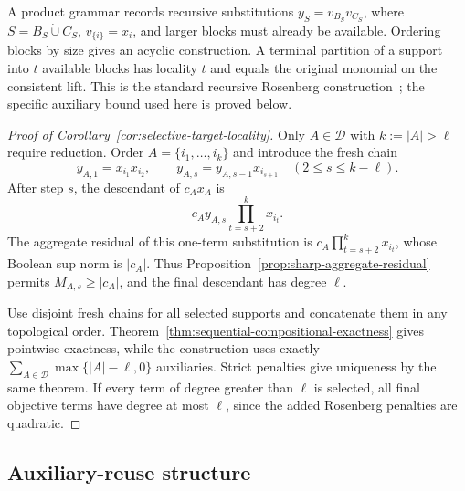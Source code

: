 \documentclass[a4paper,onecolumn,11pt,unpublished]{quantumarticle}
\theoremstyle{remark}
\begin{document}
A product grammar records recursive substitutions
\(y_S=v_{B_S}v_{C_S}\), where \(S=B_S\mathbin{\dot\cup}C_S\),
\(v_{\{i\}}=x_i\), and larger blocks must already be available.
Ordering blocks by size gives an acyclic construction.  A terminal partition
of a support into \(t\) available blocks has locality \(t\) and equals the
original monomial on the consistent lift.  This is the standard recursive
Rosenberg construction~\cite{Rosenberg1975,BorosGruber2014}; the specific
auxiliary bound used here is proved below.

\begin{proof}[Proof of Corollary~\ref{cor:selective-target-locality}]
Only \(A\in\mathcal D\) with \(k:=|A|>\ell\) require reduction.  Order
\(A=\{i_1,\ldots,i_k\}\) and introduce the fresh chain
\begin{equation}
  y_{A,1}=x_{i_1}x_{i_2},
  \qquad
  y_{A,s}=y_{A,s-1}x_{i_{s+1}}
  \quad(2\leq s\leq k-\ell).
  \label{eq:fresh-chain}
\end{equation}
After step \(s\), the descendant of \(c_Ax_A\) is
\begin{equation}
  c_Ay_{A,s}\prod_{t=s+2}^{k}x_{i_t}.
  \label{eq:fresh-chain-descendant}
\end{equation}
The aggregate residual of this one-term substitution is
\(c_A\prod_{t=s+2}^{k}x_{i_t}\), whose Boolean sup norm is \(|c_A|\).
Thus Proposition~\ref{prop:sharp-aggregate-residual} permits
\(M_{A,s}\geq|c_A|\), and the final descendant has degree \(\ell\).

Use disjoint fresh chains for all selected supports and concatenate them in
any topological order.  Theorem~\ref{thm:sequential-compositional-exactness}
gives pointwise exactness, while the construction uses exactly
\(\sum_{A\in\mathcal D}\max\{|A|-\ell,0\}\) auxiliaries.  Strict penalties
give uniqueness by the same theorem.  If every term of degree greater than
\(\ell\) is selected, all final objective terms have degree at most
\(\ell\), since the added Rosenberg penalties are quadratic.
\end{proof}


\subsection{Auxiliary-reuse structure}
\label{app:cubic-structure}
\end{document}
